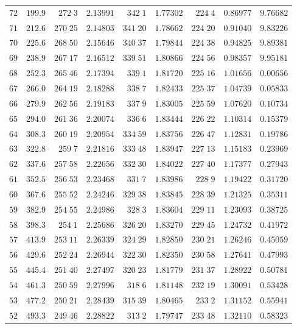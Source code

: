 \begin{center}
\begin{tabular}{r|r|r|r|r|r|r|r|r}
$72$&$199.9$&$272\;3$&$2.13991$&$342\;1$&$1.77302$&$224\;4$&$0.86977$&$9.76682$\\
$71$&$212.6$&$270\;25$&$2.14803$&$341\;20$&$1.78662$&$224\;20$&$0.91040$&$9.83226$\\[2pt]
$70$&$225.6$&$268\;50$&$2.15646$&$340\;37$&$1.79844$&$224\;38$&$0.94825$&$9.89381$\\
$69$&$238.9$&$267\;17$&$2.16512$&$339\;51$&$1.80866$&$224\;56$&$0.98357$&$9.95181$\\
$68$&$252.3$&$265\;46$&$2.17394$&$339\;1$&$1.81720$&$225\;16$&$1.01656$&$0.00656$\\
$67$&$266.0$&$264\;19$&$2.18288$&$338\;7$&$1.82433$&$225\;37$&$1.04739$&$0.05833$\\
$66$&$279.9$&$262\;56$&$2.19183$&$337\;9$&$1.83005$&$225\;59$&$1.07620$&$0.10734$\\[2pt]
$65$&$294.0$&$261\;36$&$2.20074$&$336\;6$&$1.83444$&$226\;22$&$1.10314$&$0.15379$\\
$64$&$308.3$&$260\;19$&$2.20954$&$334\;59$&$1.83756$&$226\;47$&$1.12831$&$0.19786$\\
$63$&$322.8$&$259\;7$&$2.21816$&$333\;48$&$1.83947$&$227\;13$&$1.15183$&$0.23969$\\
$62$&$337.6$&$257\;58$&$2.22656$&$332\;30$&$1.84022$&$227\;40$&$1.17377$&$0.27943$\\
$61$&$352.5$&$256\;53$&$2.23468$&$331\;7$&$1.83986$&$228\;9$&$1.19422$&$0.31720$\\[2pt]
$60$&$367.6$&$255\;52$&$2.24246$&$329\;38$&$1.83845$&$228\;39$&$1.21325$&$0.35311$\\
$59$&$382.9$&$254\;55$&$2.24986$&$328\;3$&$1.83604$&$229\;11$&$1.23093$&$0.38725$\\
$58$&$398.3$&$254\;1$&$2.25686$&$326\;20$&$1.83270$&$229\;45$&$1.24732$&$0.41972$\\
$57$&$413.9$&$253\;11$&$2.26339$&$324\;29$&$1.82850$&$230\;21$&$1.26246$&$0.45059$\\
$56$&$429.6$&$252\;24$&$2.26944$&$322\;30$&$1.82350$&$230\;58$&$1.27641$&$0.47993$\\[2pt]
$55$&$445.4$&$251\;40$&$2.27497$&$320\;23$&$1.81779$&$231\;37$&$1.28922$&$0.50781$\\
$54$&$461.3$&$250\;59$&$2.27996$&$318\;6$&$1.81148$&$232\;19$&$1.30091$&$0.53428$\\
$53$&$477.2$&$250\;21$&$2.28439$&$315\;39$&$1.80465$&$233\;2$&$1.31152$&$0.55941$\\
$52$&$493.3$&$249\;46$&$2.28822$&$313\;2$&$1.79747$&$233\;48$&$1.32110$&$0.58323$\\

\end{tabular}
\end{center}
